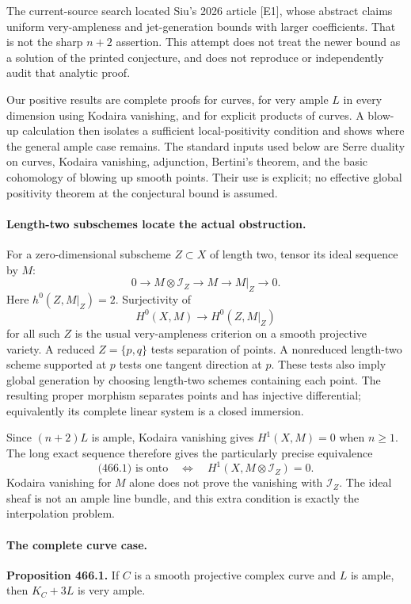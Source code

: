 \documentclass[11pt]{article}
\begin{document}
The current-source search located Siu's 2026 article [E1], whose abstract
claims uniform very-ampleness and jet-generation bounds with larger
coefficients. That is not the sharp $n+2$ assertion. This attempt does
not treat the newer bound as a solution of the printed conjecture,
and does not reproduce or independently audit that analytic proof.

Our positive results are complete proofs for curves, for very ample
$L$ in every dimension using Kodaira vanishing, and for explicit
products of curves. A blow-up calculation then isolates a sufficient
local-positivity condition and shows where the general ample case remains.
The standard inputs used below are Serre duality on curves, Kodaira
vanishing, adjunction, Bertini's theorem, and the basic cohomology of
blowing up smooth points. Their use is explicit; no effective global
positivity theorem at the conjectural bound is assumed.

\paragraph{Length-two subschemes locate the actual obstruction.}
For a zero-dimensional subscheme $Z\subset X$ of length two, tensor
its ideal sequence by $M$:
\[
 0\longrightarrow M\otimes\mathcal I_Z\longrightarrow M
 \longrightarrow M|_Z\longrightarrow0.
\]
Here $h^0(Z,M|_Z)=2$. Surjectivity of
\[
 H^0(X,M)\longrightarrow H^0(Z,M|_Z)
 \tag{466.1}
\]
for all such $Z$ is the usual very-ampleness criterion on a smooth
projective variety. A reduced $Z=\{p,q\}$ tests separation of points.
A nonreduced length-two scheme supported at $p$ tests one tangent
direction at $p$. These tests also imply global generation by choosing
length-two schemes containing each point. The resulting proper morphism
separates points and has injective differential; equivalently its
complete linear system is a closed immersion.

Since $(n+2)L$ is ample, Kodaira vanishing gives $H^1(X,M)=0$ when
$n\geq1$. The long exact sequence therefore gives the particularly
precise equivalence
\[
 \text{(466.1) is onto}\quad\Longleftrightarrow\quad
 H^1(X,M\otimes\mathcal I_Z)=0.
 \tag{466.2}
\]
Kodaira vanishing for $M$ alone does not prove the vanishing with
$\mathcal I_Z$. The ideal sheaf is not an ample line bundle, and
this extra condition is exactly the interpolation problem.

\paragraph{The complete curve case.}
\textbf{Proposition 466.1.} If $C$ is a smooth projective complex curve
and $L$ is ample, then $K_C+3L$ is very ample.
\end{document}
